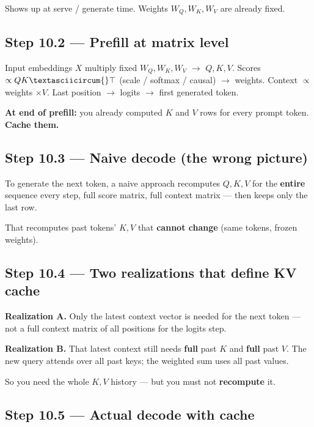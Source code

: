 \documentclass[11pt,a4paper]{article}
\begin{document}
Shows up at serve / generate time. Weights \(W_Q,W_K,W_V\) are already fixed.


\subsection{Step 10.2 --- Prefill at matrix level}

Input embeddings \(X\) multiply fixed \(W_Q,W_K,W_V\) $\rightarrow$ \(Q,K,V\).   Scores \(\propto QK\textasciicircum{}\top\) (scale / softmax / causal) $\rightarrow$ weights. Context \(\propto\) weights \(\times V\). Last position $\rightarrow$ logits $\rightarrow$ first generated token.


\textbf{At end of prefill:} you already computed \(K\) and \(V\) rows for every prompt token. \textbf{Cache them.}


\subsection{Step 10.3 --- Naive decode (the wrong picture)}

To generate the next token, a naive approach recomputes \(Q,K,V\) for the \textbf{entire} sequence every step, full score matrix, full context matrix --- then keeps only the last row.


That recomputes past tokens' \(K,V\) that \textbf{cannot change} (same tokens, frozen weights).


\subsection{Step 10.4 --- Two realizations that define KV cache}


\textbf{Realization A.} Only the latest context vector is needed for the next token --- not a full context matrix of all positions for the logits step.


\textbf{Realization B.} That latest context still needs \textbf{full} past \(K\) and \textbf{full} past \(V\). The new query attends over all past keys; the weighted sum uses all past values.


So you need the whole \(K,V\) history --- but you must not \textbf{recompute} it.


\subsection{Step 10.5 --- Actual decode with cache}
\end{document}
